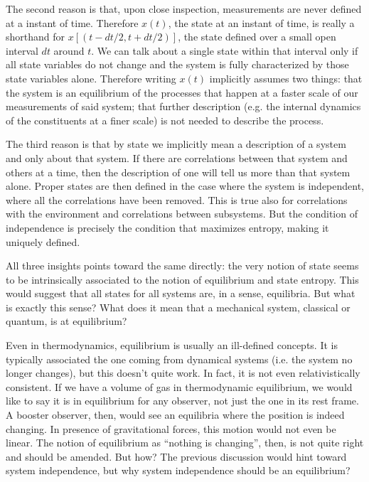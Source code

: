 \documentclass[letterpaper,twocolumn]{article}
\begin{document}
The second reason is that, upon close inspection, measurements are never defined at a instant of time. Therefore $x(t)$, the state at an instant of time, is really a shorthand for $x[(t - dt/2, t + dt/2)]$, the state defined over a small open interval $dt$ around $t$. We can talk about a single state within that interval only if all state variables do not change and the system is fully characterized by those state variables alone. Therefore writing $x(t)$ implicitly assumes two things: that the system is an equilibrium of the processes that happen at a faster scale of our measurements of said system; that further description (e.g. the internal dynamics of the constituents at a finer scale) is not needed to describe the process.

The third reason is that by state we implicitly mean a description of a system and only about that system. If there are correlations between that system and others at a time, then the description of one will tell us more than that system alone. Proper states are then defined in the case where the system is independent, where all the correlations have been removed. This is true also for correlations with the environment and correlations between subsystems. But the condition of independence is precisely the condition that maximizes entropy, making it uniquely defined. 

All three insights points toward the same directly: the very notion of state seems to be intrinsically associated to the notion of equilibrium and state entropy. This would suggest that all states for all systems are, in a sense, equilibria. But what is exactly this sense?  What does it mean that a mechanical system, classical or quantum, is at equilibrium?

Even in thermodynamics, equilibrium is usually an ill-defined concepts. It is typically associated the one coming from dynamical systems (i.e. the system no longer changes), but this doesn't quite work. In fact, it is not even relativistically consistent. If we have a volume of gas in thermodynamic equilibrium, we would like to say it is in equilibrium for any observer, not just the one in its rest frame. A booster observer, then, would see an equilibria where the position is indeed changing. In presence of gravitational forces, this motion would not even be linear. The notion of equilibrium as ``nothing is changing'', then, is not quite right and should be amended. But how? The previous discussion would hint toward system independence, but why system independence should be an equilibrium?
\end{document}
